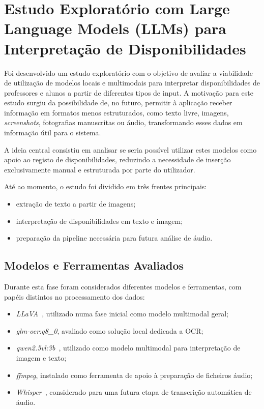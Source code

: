 %
%
\chapter{Estudo Exploratório com Large Language Models (LLMs) para Interpretação de Disponibilidades} \label{cap:llms}

Foi desenvolvido um estudo exploratório com o objetivo de avaliar a viabilidade de utilização de modelos locais e multimodais para interpretar disponibilidades de professores e alunos a partir de diferentes tipos de input.
A motivação para este estudo surgiu da possibilidade de, no futuro, permitir à aplicação receber informação em formatos menos estruturados, como texto livre, imagens, \textit{screenshots}, fotografias manuscritas ou áudio, transformando esses dados em informação útil para o sistema.

A ideia central consistiu em analisar se seria possível utilizar estes modelos como apoio ao registo de disponibilidades, reduzindo a necessidade de inserção exclusivamente manual e estruturada por parte do utilizador.

Até ao momento, o estudo foi dividido em três frentes principais:

\begin{itemize}
    \item extração de texto a partir de imagens;
    \item interpretação de disponibilidades em texto e imagem;
    \item preparação da pipeline necessária para futura análise de áudio.
\end{itemize}

\section{Modelos e Ferramentas Avaliados}

Durante esta fase foram considerados diferentes modelos e ferramentas, com papéis distintos no processamento dos dados:

\begin{itemize}
    \item \textit{LLaVA}~\cite{llava}, utilizado numa fase inicial como modelo multimodal geral;    \item \textit{glm-ocr:q8\_0}, avaliado como solução local dedicada a OCR;
    \item \textit{qwen2.5vl:3b}~\cite{qwen25-vl}, utilizado como modelo multimodal para interpretação de imagem e texto;
    \item \textit{ffmpeg}, instalado como ferramenta de apoio à preparação de ficheiros áudio;
    \item \textit{Whisper}~\cite{whisper}, considerado para uma futura etapa de transcrição automática de áudio.
\end{itemize}

